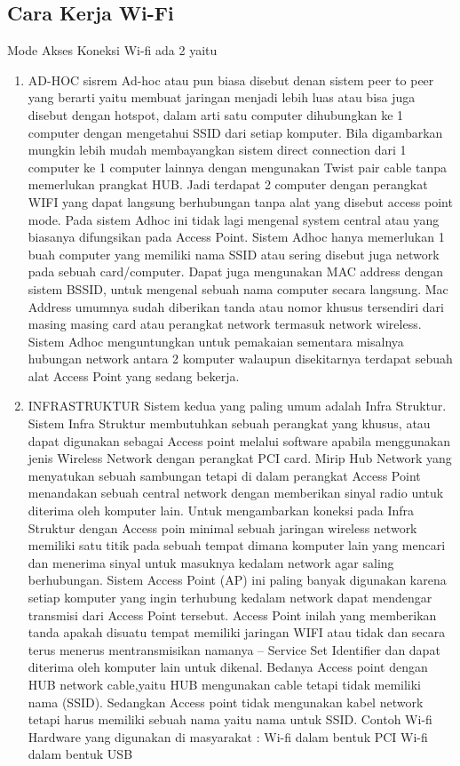 \subsection {Cara Kerja Wi-Fi}
 Mode Akses Koneksi Wi-fi ada 2 yaitu 
\begin{enumerate}:
\item AD-HOC
sisrem Ad-hoc atau pun biasa disebut denan sistem peer to peer yang berarti yaitu membuat jaringan menjadi lebih luas atau bisa juga 
disebut dengan hotspot, dalam arti satu computer dihubungkan ke 1 computer dengan mengetahui SSID dari setiap komputer. Bila digambarkan 
mungkin lebih mudah membayangkan sistem direct connection dari 1 computer ke 1 computer lainnya dengan mengunakan Twist pair cable tanpa 
memerlukan prangkat HUB. Jadi terdapat 2 computer dengan perangkat WIFI yang dapat langsung berhubungan tanpa alat yang disebut access 
point mode. Pada sistem Adhoc ini tidak lagi mengenal system central atau yang biasanya difungsikan pada Access Point. Sistem Adhoc hanya 
memerlukan 1 buah computer yang memiliki nama SSID atau sering disebut juga network pada sebuah card/computer. Dapat juga mengunakan MAC 
address dengan sistem BSSID, untuk mengenal sebuah nama computer secara langsung. Mac Address umumnya sudah diberikan tanda atau nomor 
khusus tersendiri dari masing masing card atau perangkat network termasuk network wireless. Sistem Adhoc menguntungkan untuk pemakaian
sementara misalnya hubungan network antara 2 komputer walaupun disekitarnya terdapat sebuah alat Access Point yang sedang bekerja.

\item INFRASTRUKTUR
Sistem kedua yang paling umum adalah Infra Struktur. Sistem Infra Struktur membutuhkan sebuah perangkat yang khusus, atau dapat digunakan 
sebagai Access point melalui software apabila menggunakan jenis Wireless Network dengan perangkat PCI card. Mirip Hub Network yang 
menyatukan sebuah sambungan tetapi di dalam perangkat Access Point menandakan sebuah central network dengan memberikan sinyal 
radio untuk diterima oleh komputer lain. Untuk mengambarkan koneksi pada Infra Struktur dengan Access poin minimal 
sebuah jaringan wireless network memiliki satu titik pada sebuah tempat dimana komputer lain yang mencari dan menerima sinyal untuk masuknya 
kedalam network agar saling berhubungan. Sistem Access Point (AP) ini  paling banyak digunakan karena setiap komputer yang ingin 
terhubung kedalam network dapat mendengar transmisi dari Access Point tersebut. Access Point inilah yang memberikan
tanda apakah disuatu tempat memiliki jaringan WIFI atau tidak dan secara terus menerus mentransmisikan namanya – Service Set Identifier dan dapat diterima oleh komputer lain untuk dikenal. Bedanya Access point dengan HUB network cable,yaitu HUB mengunakan cable tetapi 
tidak memiliki nama (SSID). Sedangkan Access point tidak mengunakan kabel network tetapi harus memiliki sebuah nama yaitu nama untuk SSID.
Contoh Wi-fi Hardware yang digunakan di masyarakat : Wi-fi dalam bentuk PCI Wi-fi dalam bentuk USB

\end{enumerate}
